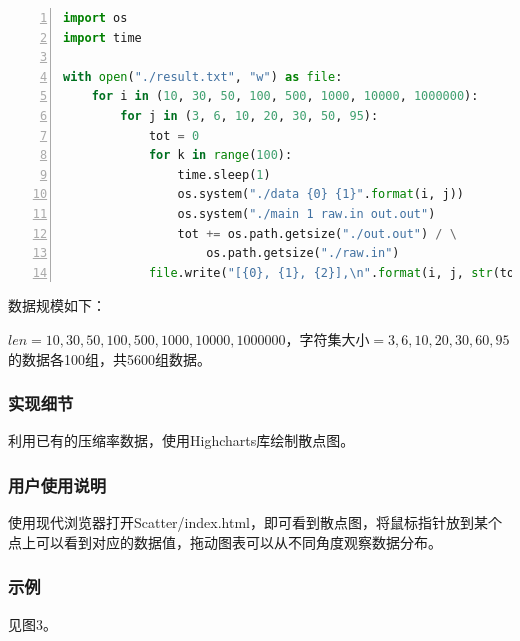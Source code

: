 \documentclass{article}
\begin{document}
\begin{lstlisting}[language={python},
    numbers=left,
    numberstyle=\tiny\consolas,
    basicstyle=\small\consolas]
import os
import time

with open("./result.txt", "w") as file:
    for i in (10, 30, 50, 100, 500, 1000, 10000, 1000000):
        for j in (3, 6, 10, 20, 30, 50, 95):
            tot = 0
            for k in range(100):
                time.sleep(1)
                os.system("./data {0} {1}".format(i, j))
                os.system("./main 1 raw.in out.out")
                tot += os.path.getsize("./out.out") / \
                    os.path.getsize("./raw.in")
            file.write("[{0}, {1}, {2}],\n".format(i, j, str(tot / 10)[:9]))
\end{lstlisting}

数据规模如下：

$len=10,30,50,100,500,1000,10000,1000000$，字符集大小$=3,6,10,20,30,60,95$的数据各100组，共5600组数据。

\subsubsection{实现细节}

利用已有的压缩率数据，使用Highcharts库绘制散点图。

\subsubsection{用户使用说明}

使用现代浏览器打开Scatter/index.html，即可看到散点图，将鼠标指针放到某个点上可以看到对应的数据值，拖动图表可以从不同角度观察数据分布。

\subsubsection{示例}

见图3。
\end{document}
